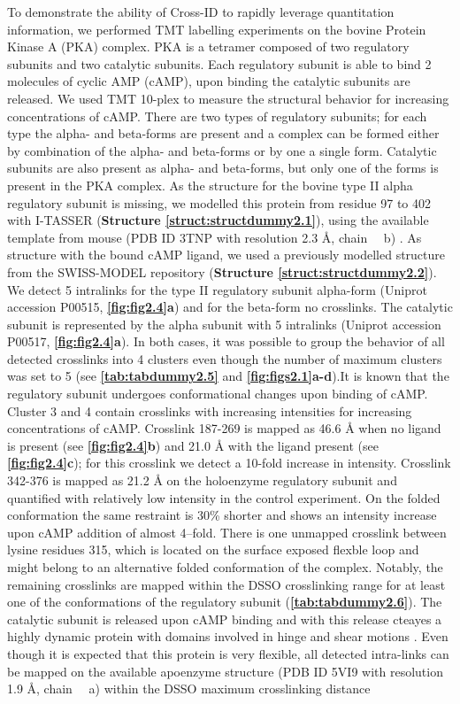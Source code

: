 To demonstrate the ability of Cross-ID to rapidly leverage quantitation information, we performed TMT labelling experiments on the bovine Protein Kinase A (PKA) complex. PKA is a tetramer composed of two regulatory subunits and two catalytic subunits. Each regulatory subunit is able to bind 2 molecules of cyclic AMP (cAMP), upon binding the catalytic subunits are released. We used TMT 10-plex to measure the structural behavior for increasing concentrations of cAMP. There are two types of regulatory subunits; for each type the alpha- and beta-forms are present and a complex can be formed either by combination of the alpha- and beta-forms or by one a single form. Catalytic subunits are also present as alpha- and beta-forms, but only one of the forms is present in the PKA complex. As the structure for the bovine type II alpha regulatory subunit is missing, we modelled this protein from residue 97 to 402 with I-TASSER \cite{yang2014i-tasser} (\textbf{Structure \ref{struct:structdummy2.1}}), using the available template from mouse (PDB ID 3TNP with resolution 2.3 Å, chain ~~b) . As structure with the bound cAMP ligand, we used a previously modelled structure from the SWISS-MODEL repository \cite{bienert2017swiss-model} (\textbf{Structure \ref{struct:structdummy2.2}}). We detect 5 intralinks for the type II regulatory subunit alpha-form (Uniprot accession P00515, \textbf{\autoref{fig:fig2.4}a}) and for the beta-form no crosslinks. The catalytic subunit is represented by the alpha subunit with 5 intralinks (Uniprot accession P00517, \textbf{\autoref{fig:fig2.4}a}). In both cases, it was possible to group the behavior of all detected crosslinks into 4 clusters even though the number of maximum clusters was set to 5 (see \textbf{\autoref{tab:tabdummy2.5}} and \textbf{\autoref{fig:figs2.1}a-d}).It is known that the regulatory subunit undergoes conformational changes upon binding of cAMP. Cluster 3 and 4 contain crosslinks with increasing intensities for increasing concentrations of cAMP. Crosslink 187-269 is mapped as 46.6 Å when no ligand is present (see \textbf{\autoref{fig:fig2.4}b}) and 21.0 Å with the ligand present (see \textbf{\autoref{fig:fig2.4}c}); for this crosslink we detect a 10-fold increase in intensity. Crosslink 342-376 is mapped as 21.2 Å on the holoenzyme regulatory subunit and quantified with relatively low intensity in the control experiment. On the folded conformation the same restraint is 30\% shorter and shows an intensity increase upon cAMP addition of almost 4–fold. There is one unmapped crosslink between lysine residues 315, which is located on the surface exposed flexble loop and might belong to an alternative folded conformation of the complex. Notably, the remaining crosslinks are mapped within the DSSO crosslinking range for at least one of the conformations of the regulatory subunit (\textbf{\autoref{tab:tabdummy2.6}}). The catalytic subunit is released upon cAMP binding and with this release cteayes a highly dynamic protein with domains involved in hinge and shear motions \cite{akamine2003dynamic}. Even though it is expected that this protein is very flexible, all detected intra-links can be mapped on the available apoenzyme structure (PDB ID 5VI9 with resolution 1.9 Å, chain ~~a) within the DSSO maximum crosslinking distance 
